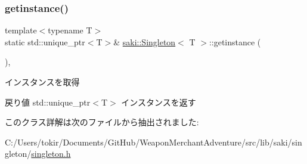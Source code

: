 \subsubsection{\texorpdfstring{getinstance()}{getinstance()}}
{\footnotesize\ttfamily template$<$typename T$>$ \\
static std\+::unique\+\_\+ptr$<$T$>$\& \mbox{\hyperlink{classsaki_1_1_singleton}{saki\+::\+Singleton}}$<$ T $>$\+::getinstance (\begin{DoxyParamCaption}{ }\end{DoxyParamCaption})\hspace{0.3cm}{\ttfamily [inline]}, {\ttfamily [static]}}



インスタンスを取得 

\begin{DoxyReturn}{戻り値}
std\+::unique\+\_\+ptr$<$\+T$>$ インスタンスを返す 
\end{DoxyReturn}


このクラス詳解は次のファイルから抽出されました\+:\begin{DoxyCompactItemize}
\item 
C\+:/\+Users/tokir/\+Documents/\+Git\+Hub/\+Weapon\+Merchant\+Adventure/src/lib/saki/singleton/\mbox{\hyperlink{singleton_8h}{singleton.\+h}}\end{DoxyCompactItemize}
